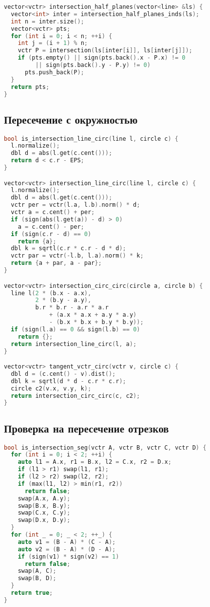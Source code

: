 \documentclass[10pt,a4paper,landscape,twosided]{extarticle}
\begin{document}
\begin{multicols*}{3}
\begin{lstlisting}[language=C++]
vector<vctr> intersection_half_planes(vector<line> &ls) {
  vector<int> inter = intersection_half_planes_inds(ls);
  int n = inter.size();
  vector<vctr> pts;
  for (int i = 0; i < n; ++i) {
    int j = (i + 1) % n;
    vctr P = intersection(ls[inter[i]], ls[inter[j]]);
    if (pts.empty() || sign(pts.back().x - P.x) != 0
         || sign(pts.back().y - P.y) != 0)
      pts.push_back(P);
  }
  return pts;
}

\end{lstlisting}

\subsection{Пересечение с окружностью}
\begin{lstlisting}[language=C++]
bool is_intersection_line_circ(line l, circle c) {
  l.normalize();
  dbl d = abs(l.get(c.cent()));
  return d < c.r - EPS;
}

vector<vctr> intersection_line_circ(line l, circle c) {
  l.normalize();
  dbl d = abs(l.get(c.cent()));
  vctr per = vctr(l.a, l.b).norm() * d;
  vctr a = c.cent() + per;
  if (sign(abs(l.get(a)) - d) > 0)
    a = c.cent() - per;
  if (sign(c.r - d) == 0)
    return {a};
  dbl k = sqrtl(c.r * c.r - d * d);
  vctr par = vctr(-l.b, l.a).norm() * k;
  return {a + par, a - par};
}

vector<vctr> intersection_circ_circ(circle a, circle b) {
  line l(2 * (b.x - a.x),
         2 * (b.y - a.y),
         b.r * b.r - a.r * a.r
             + (a.x * a.x + a.y * a.y)
             - (b.x * b.x + b.y * b.y));
  if (sign(l.a) == 0 && sign(l.b) == 0)
    return {};
  return intersection_line_circ(l, a);
}

vector<vctr> tangent_vctr_circ(vctr v, circle c) {
  dbl d = (c.cent() - v).dist();
  dbl k = sqrtl(d * d - c.r * c.r);
  circle c2(v.x, v.y, k);
  return intersection_circ_circ(c, c2);
}

\end{lstlisting}

\subsection{Проверка на пересечение отрезков}
\begin{lstlisting}[language=C++]
bool is_intersection_seg(vctr A, vctr B, vctr C, vctr D) {
  for (int i = 0; i < 2; ++i) {
    auto l1 = A.x, r1 = B.x, l2 = C.x, r2 = D.x;
    if (l1 > r1) swap(l1, r1);
    if (l2 > r2) swap(l2, r2);
    if (max(l1, l2) > min(r1, r2))
      return false;
    swap(A.x, A.y);
    swap(B.x, B.y);
    swap(C.x, C.y);
    swap(D.x, D.y);
  }
  for (int _ = 0; _ < 2; ++_) {
    auto v1 = (B - A) * (C - A);
    auto v2 = (B - A) * (D - A);
    if (sign(v1) * sign(v2) == 1)
      return false;
    swap(A, C);
    swap(B, D);
  }
  return true;
}


\end{lstlisting}
\end{multicols*}
\end{document}
